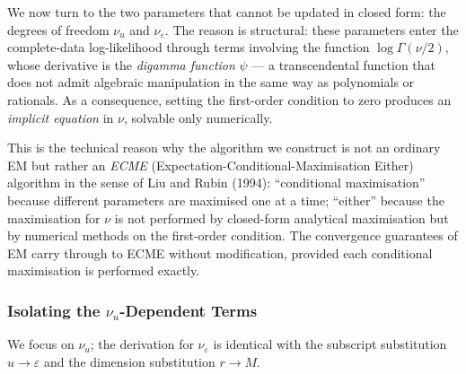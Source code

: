 \documentclass[11pt, a4paper, oneside]{article}
\begin{document}
We now turn to the two parameters that cannot be updated in closed
form: the degrees of freedom $\nu_u$ and $\nu_\varepsilon$. The reason
is structural: these parameters enter the complete-data log-likelihood
through terms involving the function $\log \Gamma(\nu/2)$, whose
derivative is the \emph{digamma function} $\psi$ — a transcendental
function that does not admit algebraic manipulation in the same way as
polynomials or rationals. As a consequence, setting the first-order
condition to zero produces an \emph{implicit equation} in $\nu$,
solvable only numerically.

This is the technical reason why the algorithm we construct is not an
ordinary EM but rather an \emph{ECME} (Expectation-Conditional-Maximisation
Either) algorithm in the sense of Liu and Rubin (1994): ``conditional
maximisation'' because different parameters are maximised one at a
time; ``either'' because the maximisation for $\nu$ is not performed
by closed-form analytical maximisation but by numerical methods on the
first-order condition. The convergence guarantees of EM carry through
to ECME without modification, provided each conditional maximisation
is performed exactly.

\subsubsection{Isolating the $\nu_u$-Dependent Terms}

We focus on $\nu_u$; the derivation for $\nu_\varepsilon$ is identical
with the subscript substitution $u \to \varepsilon$ and the dimension
substitution $r \to M$.
\end{document}
